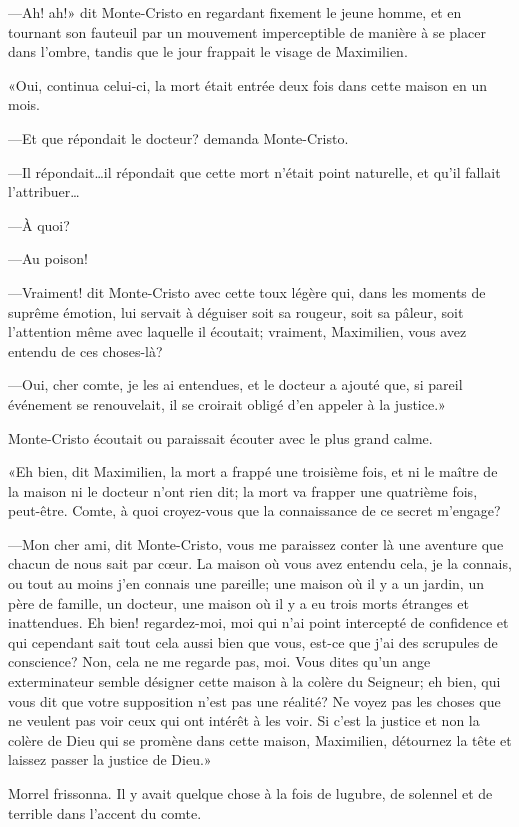 —Ah! ah!» dit Monte-Cristo en regardant fixement le jeune homme, et en tournant son fauteuil par un mouvement imperceptible de manière à se placer dans l'ombre, tandis que le jour frappait le visage de Maximilien. 

«Oui, continua celui-ci, la mort était entrée deux fois dans cette maison en un mois. 

—Et que répondait le docteur? demanda Monte-Cristo. 

—Il répondait\dots il répondait que cette mort n'était point naturelle, et qu'il fallait l'attribuer\dots 

—À quoi? 

—Au poison! 

—Vraiment! dit Monte-Cristo avec cette toux légère qui, dans les moments de suprême émotion, lui servait à déguiser soit sa rougeur, soit sa pâleur, soit l'attention même avec laquelle il écoutait; vraiment, Maximilien, vous avez entendu de ces choses-là? 

—Oui, cher comte, je les ai entendues, et le docteur a ajouté que, si pareil événement se renouvelait, il se croirait obligé d'en appeler à la justice.» 

Monte-Cristo écoutait ou paraissait écouter avec le plus grand calme. 

«Eh bien, dit Maximilien, la mort a frappé une troisième fois, et ni le maître de la maison ni le docteur n'ont rien dit; la mort va frapper une quatrième fois, peut-être. Comte, à quoi croyez-vous que la connaissance de ce secret m'engage? 

—Mon cher ami, dit Monte-Cristo, vous me paraissez conter là une aventure que chacun de nous sait par cœur. La maison où vous avez entendu cela, je la connais, ou tout au moins j'en connais une pareille; une maison où il y a un jardin, un père de famille, un docteur, une maison où il y a eu trois morts étranges et inattendues. Eh bien! regardez-moi, moi qui n'ai point intercepté de confidence et qui cependant sait tout cela aussi bien que vous, est-ce que j'ai des scrupules de conscience? Non, cela ne me regarde pas, moi. Vous dites qu'un ange exterminateur semble désigner cette maison à la colère du Seigneur; eh bien, qui vous dit que votre supposition n'est pas une réalité? Ne voyez pas les choses que ne veulent pas voir ceux qui ont intérêt à les voir. Si c'est la justice et non la colère de Dieu qui se promène dans cette maison, Maximilien, détournez la tête et laissez passer la justice de Dieu.» 

Morrel frissonna. Il y avait quelque chose à la fois de lugubre, de solennel et de terrible dans l'accent du comte. 

